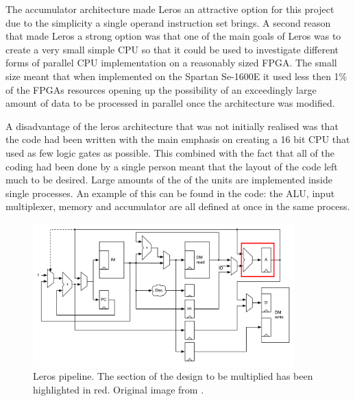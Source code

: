 The accumulator architecture made Leros an attractive option for this project due to 
the simplicity a single operand instruction set brings. A second reason that made Leros a strong option was that one of the main goals of Leros was to create a very small simple CPU so that it could be used to investigate different forms of parallel CPU implementation on a reasonably sized FPGA. The small size meant that when implemented on the Spartan Se-1600E it used less then 1\% of the FPGAs resources opening up the possibility of an exceedingly large amount of data to be processed in parallel once the architecture was modified.

A disadvantage of the leros architecture that was not initially realised was that the code had been written with the main emphasis on creating a 16 bit CPU that used as few logic gates as possible. This combined with the fact that all of the coding had been done by a single person meant that the layout of the code left much to be desired. Large amounts of the of the units are implemented inside single processes. An example of this can be found in the code: the ALU, input multiplexer, memory and accumulator are all defined at once in the same process.
 
\begin{figure}[h]
\center
\includegraphics[width=0.9\textwidth]{images/leros-system}
\caption{Leros pipeline. The section of the design to be multiplied has been
highlighted in red. Original image from \cite{schoeberlleros}.
}
\label{fig:leros-system}
\end{figure}
